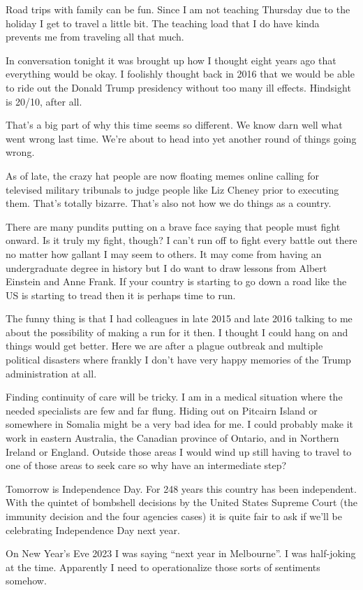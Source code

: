 Road trips with family can be fun. Since I am not teaching Thursday due
to the holiday I get to travel a little bit. The teaching load that I do
have kinda prevents me from traveling all that much.

In conversation tonight it was brought up how I thought eight years ago
that everything would be okay. I foolishly thought back in 2016 that we
would be able to ride out the Donald Trump presidency without too many
ill effects. Hindsight is 20/10, after all.

That's a big part of why this time seems so different. We know darn well
what went wrong last time. We're about to head into yet another round of
things going wrong.

As of late, the crazy hat people are now floating memes online calling
for televised military tribunals to judge people like Liz Cheney prior
to executing them. That's totally bizarre. That's also not how we do
things as a country.

There are many pundits putting on a brave face saying that people must
fight onward. Is it truly my fight, though? I can't run off to fight
every battle out there no matter how gallant I may seem to others. It
may come from having an undergraduate degree in history but I do want to
draw lessons from Albert Einstein and Anne Frank. If your country is
starting to go down a road like the US is starting to tread then it is
perhaps time to run.

The funny thing is that I had colleagues in late 2015 and late 2016
talking to me about the possibility of making a run for it then. I
thought I could hang on and things would get better. Here we are after a
plague outbreak and multiple political disasters where frankly I don't
have very happy memories of the Trump administration at all.

Finding continuity of care will be tricky. I am in a medical situation
where the needed specialists are few and far flung. Hiding out on
Pitcairn Island or somewhere in Somalia might be a very bad idea for me.
I could probably make it work in eastern Australia, the Canadian
province of Ontario, and in Northern Ireland or England. Outside those
areas I would wind up still having to travel to one of those areas to
seek care so why have an intermediate step?

Tomorrow is Independence Day. For 248 years this country has been
independent. With the quintet of bombshell decisions by the United
States Supreme Court (the immunity decision and the four agencies cases)
it is quite fair to ask if we'll be celebrating Independence Day next
year.

On New Year's Eve 2023 I was saying ``next year in Melbourne''. I was
half-joking at the time. Apparently I need to operationalize those sorts
of sentiments somehow.
